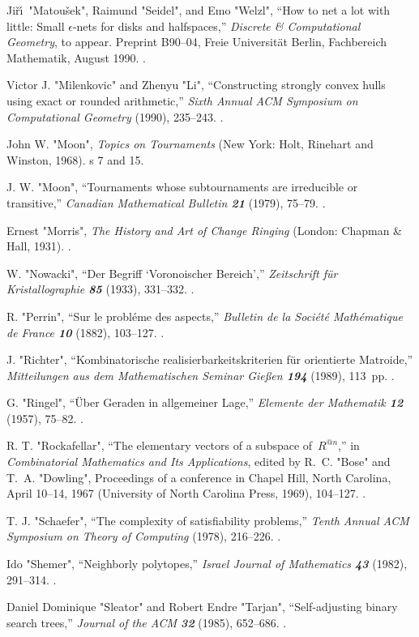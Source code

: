 \bib[54]
Ji\v r\'\i\  "Matou\v sek", Raimund "Seidel", and Emo "Welzl", ``How to net a
lot with little: Small $\epsilon$-nets for disks and halfspaces,''
{\sl Discrete \& Computational Geometry}, to appear. Preprint B90--04,
Freie Universit\"at Berlin, Fachbereich Mathematik, August 1990.
.

\bib[55]
Victor J. "Milenkovic" and Zhenyu "Li", ``Constructing strongly convex
hulls using exact or rounded arithmetic,'' {\sl Sixth
Annual ACM Symposium on Computational Geometry\/} (1990), 235--243.
.

\bib[56]
John W. "Moon", {\sl Topics on Tournaments\/} (New York: Holt, Rinehart
and Winston, 1968).
\>s 7 and 15.

\bib[57]
J. W. "Moon", ``Tournaments whose subtournaments are irreducible or
transitive,'' {\sl Canadian Mathematical Bulletin\/ \bf 21} (1979),
75--79.
.

\bib[58]
Ernest "Morris", {\sl The History and Art of Change Ringing\/} (London:
Chapman \& Hall, 1931).
.

\bib[59]
W. "Nowacki", ``Der Begriff `Voronoischer Bereich','' {\sl Zeitschrift
f\"ur Kristallographie\/ \bf 85} (1933), 331--332.
.

\bib[60]
R. "Perrin", ``Sur le probl\'eme des aspects,'' {\sl Bulletin
de la Soci\'et\'e Math\'ematique de France\/ \bf10} (1882), 103--127.
.

\bib[61]
J. "Richter", ``Kombinatorische realisierbarkeitskriterien f\"ur
orientierte Ma\-troide,'' {\sl Mitteil\-ungen aus dem Mathematischen Seminar
Gie{\ss}en\/ \bf194} (1989), 113~pp.
.

\bib[62]
G. "Ringel", ``\"Uber Geraden in allgemeiner Lage,'' {\sl Elemente der
Mathematik\/ \bf 12} (1957), 75--82.
.

\bib[63]
R. T. "Rockafellar", ``The elementary vectors of a subspace of~$R^{@n}$,''
in {\sl Combinatorial Mathematics and Its Applications}, edited by
R.~C. "Bose" and T.~A. "Dowling", Proceedings of a conference in Chapel
Hill, North Carolina, April 10--14, 1967 (University of North Carolina
Press, 1969), 104--127.
.

\bib[64]
T. J. "Schaefer", ``The complexity of satisfiability problems,'' {\sl
Tenth Annual ACM Symposium on Theory of Computing\/} (1978),
216--226.
.

\bib[65]
Ido "Shemer", ``Neighborly polytopes,'' {\sl Israel Journal
of Mathematics\/ \bf43} (1982), 291--314.
.

\bib[66]
Daniel Dominique "Sleator" and Robert Endre "Tarjan", ``Self-adjusting
binary search trees,'' {\sl Journal of the ACM\/ \bf 32} (1985), 652--686.
.

